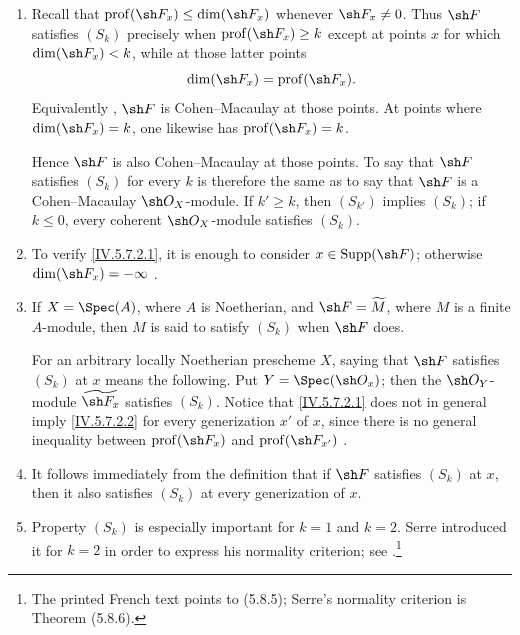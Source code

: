 \begin{remarks}[5.7.3]
\label{IV.5.7.3}
\begin{enumerate}[{\rm(i)}]
\item
{}
\label{IV.5.7.3.i}
Recall that
$\operatorname{prof}(\sh F_x)\leq\dim(\sh F_x)$
 whenever $\sh F_x\neq0$.  Thus $\sh F$
satisfies $(S_k)$ precisely when
$\operatorname{prof}(\sh F_x)\geq k$ except at points $x$ for which
$\dim(\sh F_x)<k$, while at those latter points
\[
\dim(\sh F_x)=\operatorname{prof}(\sh F_x).
\]
Equivalently , $\sh F$ is Cohen--Macaulay at those
points.  At points where $\dim(\sh F_x)=k$, one likewise has
$\operatorname{prof}(\sh F_x)=k$.


Hence $\sh F$ is also Cohen--Macaulay at those points.  To say that
$\sh F$ satisfies $(S_k)$ for every $k$ is therefore the same as to
say that $\sh F$ is a Cohen--Macaulay $\sh O_X$-module.  If
$k'\geq k$, then $(S_{k'})$ implies $(S_k)$; if $k\leq0$, every
coherent $\sh O_X$-module satisfies $(S_k)$.

\item
{}
\label{IV.5.7.3.ii}
To verify \eqref{IV.5.7.2.1}, it is enough to consider
$x\in\operatorname{Supp}(\sh F)$; otherwise
$\dim(\sh F_x)=-\infty$ .

\item
{}
\label{IV.5.7.3.iii}
If $X=\Spec(A)$, where $A$ is Noetherian, and
$\sh F=\widetilde M$, where $M$ is a finite $A$-module, then $M$ is
said to satisfy $(S_k)$ when $\sh F$ does.

For an arbitrary locally Noetherian prescheme $X$, saying that
$\sh F$ satisfies $(S_k)$ at $x$ means the following.  Put
$Y=\Spec(\sh O_x)$; then the $\sh O_Y$-module
$\widetilde{\sh F_x}$ satisfies $(S_k)$.  Notice that
\eqref{IV.5.7.2.1} does not in general imply
\eqref{IV.5.7.2.2} for every generization $x'$ of $x$, since there
is no general inequality between
$\operatorname{prof}(\sh F_x)$ and
$\operatorname{prof}(\sh F_{x'})$ .

\item
{}
\label{IV.5.7.3.iv}
It follows immediately from the definition that if $\sh F$
satisfies $(S_k)$ at $x$, then it also satisfies $(S_k)$ at every
generization of $x$.

\item
{}
\label{IV.5.7.3.v}
Property $(S_k)$ is especially important for $k=1$ and $k=2$.
Serre introduced it for $k=2$ in order to express his normality
criterion; see .\footnote{The printed French text points to
\textup{(5.8.5)}; Serre's normality criterion is Theorem
\textup{(5.8.6)}.}


\end{enumerate}
\end{remarks}
